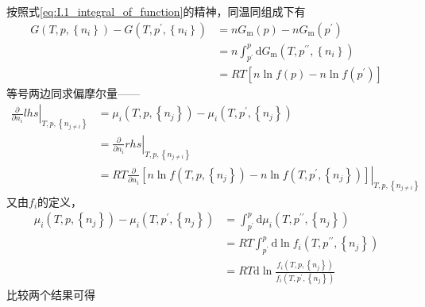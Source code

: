 \documentclass[main.tex]{subfiles}
\begin{document}
按照式\eqref{eq:I.1_integral_of_function}的精神，同温同组成下有
\begin{align*}
  G\left(T,p,\left\{n_i\right\}\right)-G\left(T,p^\prime,\left\{n_i\right\}\right) & =nG_\text{m}\left(p\right)-nG_\text{m}\left(p^\prime\right)                               \\
                                                                                   & =n\int_{p^\prime}^p\mathrm{d}G_\text{m}\left(T,p^{\prime\prime},\left\{n_i\right\}\right) \\
                                                                                   & =RT\left[n\ln f\left(p\right)-n\ln f\left(p^\prime\right)\right]
\end{align*}
等号两边同求偏摩尔量——
\begin{align*}
  \left.\frac{\partial}{\partial n_i}lhs\right|_{T,p,\left\{n_{j\neq i}\right\}} & =\mu_i\left(T,p,\left\{n_j\right\}\right)-\mu_i\left(T,p^\prime,\left\{n_j\right\}\right)                                                                                             \\
                                                                                 & =\left.\frac{\partial}{\partial n_i}rhs\right|_{T,p,\left\{n_{j\neq i}\right\}}                                                                                                       \\
                                                                                 & =RT\left.\frac{\partial}{\partial n_i}\left[n\ln f\left(T,p,\left\{n_j\right\}\right)-n\ln f\left(T,p^\prime,\left\{n_j\right\}\right)\right]\right|_{T,p,\left\{n_{j\neq i}\right\}}
\end{align*}
又由$f_i$的定义，
\begin{align*}
  \mu_i\left(T,p,\left\{n_j\right\}\right)-\mu_i\left(T,p^\prime,\left\{n_j\right\}\right) & =\int_{p^\prime}^p\mathrm{d}\mu_i\left(T,p^{\prime\prime},\left\{n_j\right\}\right)                          \\
                                                                                           & =RT\int_{p^\prime}^p\mathrm{d}\ln f_i\left(T,p^{\prime\prime},\left\{n_j\right\}\right)                      \\
                                                                                           & =RT\mathrm{d}\ln\frac{f_i\left(T,p,\left\{n_j\right\}\right)}{f_i\left(T,p^\prime,\left\{n_j\right\}\right)}
\end{align*}
比较两个结果可得
\end{document}
